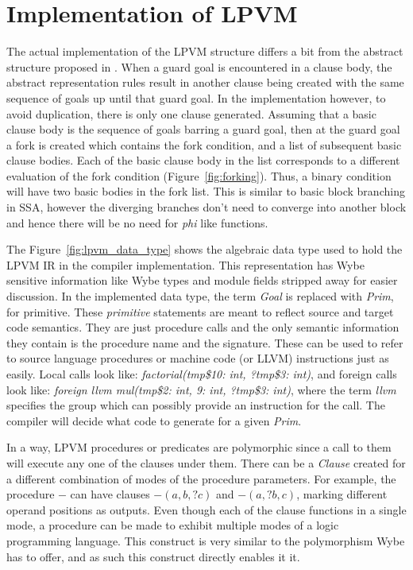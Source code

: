 \chapter{Implementation of LPVM}
\label{chap:lpvm}

The actual implementation of the LPVM structure differs a bit from the abstract
structure proposed in \cite{lpvm2015}. When a guard goal is encountered in a
clause body, the abstract representation rules result in another clause being
created with the same sequence of goals up until that guard goal. In the
implementation however, to avoid duplication, there is only one clause
generated. Assuming that a basic clause body is the sequence of goals barring a
guard goal, then at the guard goal a fork is created which contains the fork
condition, and a list of subsequent basic clause bodies. Each of the basic
clause body in the list corresponds to a different evaluation of the fork
condition (Figure~\ref{fig:forking}). Thus, a binary condition will have two
basic bodies in the fork list. This is similar to basic block branching in SSA,
however the diverging branches don't need to converge into another block and
hence there will be no need for \textit{phi} like functions.

The Figure~\ref{fig:lpvm_data_type} shows the algebraic data type used to hold
the LPVM IR in the compiler implementation. This representation has Wybe
sensitive information like Wybe types and module fields stripped away for
easier discussion. In the implemented data type, the term \textit{Goal} is
replaced with \textit{Prim}, for primitive. These \textit{primitive} statements
are meant to reflect source and target code semantics. They are just procedure
calls and the only semantic information they contain is the procedure name and
the signature. These can be used to refer to source language procedures or
machine code (or LLVM) instructions just as easily. Local calls look like:
\textit{factorial(tmp\$10: int, ?tmp\$3: int)}, and foreign calls look like:
\textit{foreign llvm mul(tmp\$2: int, 9: int, ?tmp\$3: int)}, where the term
\textit{llvm} specifies the group which can possibly provide an instruction for
the call. The compiler will decide what code to generate for a given
\textit{Prim}.

In a way, LPVM procedures or predicates are polymorphic since a call to them
will execute any one of the clauses under them. There can be a \textit{Clause}
created for a different combination of modes of the procedure parameters. For
example, the procedure \( - \) can have clauses \( -(a, b, ?c) \) and
\( -(a, ?b, c) \), marking different operand positions as outputs. Even though
each of the clause functions in a single mode, a procedure can be made to
exhibit multiple modes of a logic programming language. This construct is very
similar to the polymorphism Wybe has to offer, and as such this construct
directly enables it it.


